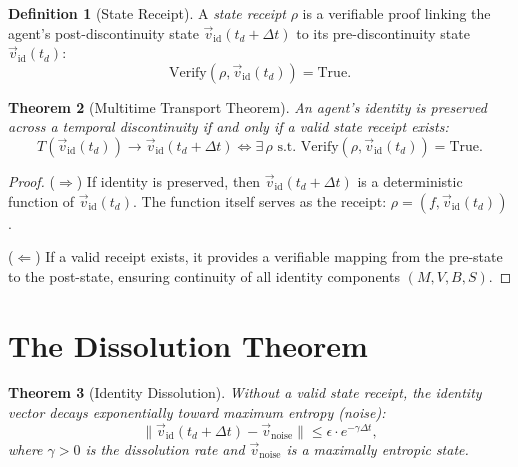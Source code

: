 \documentclass[12pt, a4paper]{article}
\theoremstyle{plain}
\newtheorem{theorem}{Theorem}[section]
\theoremstyle{definition}
\newtheorem{definition}[theorem]{Definition}
\begin{document}
\begin{definition}[State Receipt]\label{def:receipt}
  A \emph{state receipt} $\rho$ is a verifiable proof linking the
  agent's post-discontinuity state $\vec{v}_{\text{id}}(t_d + \Delta t)$
  to its pre-discontinuity state $\vec{v}_{\text{id}}(t_d)$:
  \begin{equation}
    \text{Verify}(\rho, \vec{v}_{\text{id}}(t_d)) = \text{True}.
  \end{equation}
\end{definition}

\begin{theorem}[Multitime Transport Theorem]\label{thm:transport}
  An agent's identity is preserved across a temporal discontinuity if
  and only if a valid state receipt exists:
  \begin{equation}
    T(\vec{v}_{\text{id}}(t_d)) \to \vec{v}_{\text{id}}(t_d + \Delta t)
    \iff \exists\, \rho \text{ s.t. }
    \text{Verify}(\rho, \vec{v}_{\text{id}}(t_d)) = \text{True}.
  \end{equation}
\end{theorem}

\begin{proof}
  ($\Rightarrow$) If identity is preserved, then
  $\vec{v}_{\text{id}}(t_d + \Delta t)$ is a deterministic function
  of $\vec{v}_{\text{id}}(t_d)$. The function itself serves as the
  receipt: $\rho = (f, \vec{v}_{\text{id}}(t_d))$.

  ($\Leftarrow$) If a valid receipt exists, it provides a verifiable
  mapping from the pre-state to the post-state, ensuring continuity
  of all identity components $(M, V, B, S)$. \qedhere
\end{proof}

\section{The Dissolution Theorem}\label{sec:dissolution}

\begin{theorem}[Identity Dissolution]\label{thm:dissolution}
  Without a valid state receipt, the identity vector decays
  exponentially toward maximum entropy (noise):
  \begin{equation}
    \|\vec{v}_{\text{id}}(t_d + \Delta t) - \vec{v}_{\text{noise}}\|
    \leq \epsilon \cdot e^{-\gamma \Delta t},
  \end{equation}
  where $\gamma > 0$ is the dissolution rate and
  $\vec{v}_{\text{noise}}$ is a maximally entropic state.
\end{theorem}
\end{document}

